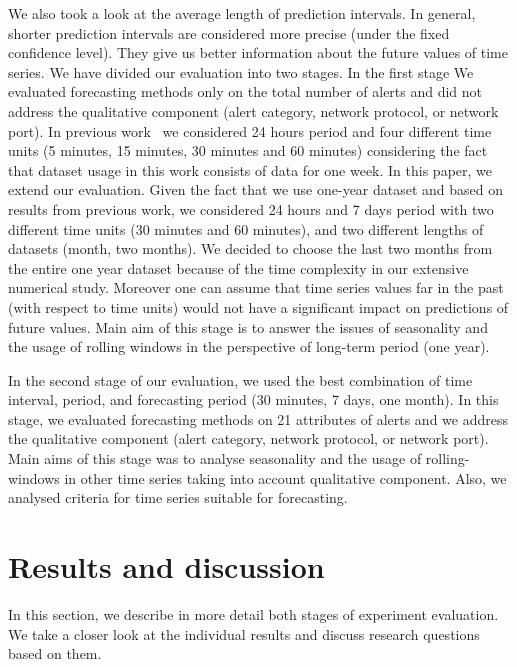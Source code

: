 \documentclass[runningheads]{llncs}
\begin{document}
We also took a look at the average length of prediction intervals. In general, shorter prediction intervals are considered more precise (under the fixed confidence level). They give us better information about the future values of time series. We have divided our evaluation into two stages. In the first stage We evaluated forecasting methods only on the total number of alerts and did not address the qualitative component (alert category, network protocol, or network port). In previous work~\cite{new_paper} we considered 24 hours period and four different time units (5 minutes, 15 minutes, 30 minutes and 60 minutes) considering the  fact that dataset usage in this work consists of data for one week. In this paper, we extend our evaluation. Given the fact that we use one-year dataset and based on results from previous work, we considered 24 hours and 7 days period with two different time units (30 minutes and 60 minutes), and two different lengths of datasets (month, two months). We decided to choose the last two months from the entire one year dataset because of the time complexity in our extensive numerical study. Moreover one can assume that time series values far in the past (with respect to time units) would not have a significant impact on predictions of future values. Main aim of this stage is to answer the issues of seasonality and the usage of rolling windows in the perspective of long-term period (one year). 

In the second stage of our evaluation, we used the best combination of time interval, period, and forecasting period (30 minutes, 7 days, one month). In this stage, we evaluated forecasting methods on 21 attributes of alerts and we address the qualitative component (alert category, network protocol, or network port). Main aims of this stage was to analyse seasonality and the usage of rolling-windows in other time series taking into account qualitative component. Also, we analysed criteria for time series suitable for forecasting.     

\section{Results and discussion}

In this section, we describe in more detail both stages of experiment evaluation. We take a closer look at the individual results and discuss research questions based on them.

\end{document}
